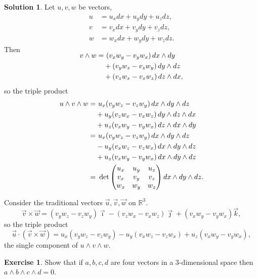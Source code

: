 \documentclass[11pt, a4paper]{report}
\theoremstyle{definition}
\newtheorem{exercise}{Exercise}[part]
\newtheorem{solution}{Solution}[part]
\newenvironment{ex}{\begin{exercise}}{\end{exercise}\pagebreak[1]}
\newenvironment{sol}{\begin{solution}}{\end{solution}\pagebreak[3]}
\newcommand*{\op}[1]{\ensuremath\mathop{}\mathopen{}#1}
\renewcommand*{\d}{\op{d}}
\begin{document}
\begin{sol}

Let $u, v, w$ be vectors,
\begin{align*}
    u &= u_x dx + u_y dy + u_z dz, \\
    v &= v_x dx + v_y dy + v_z dz, \\
    w &= w_x dx + w_y dy + w_z dz.
\end{align*}
Then
\begin{align*}
    \SwapAboveDisplaySkip
    v \wedge w =&\ (v_x w_y - v_y w_x) \d x \wedge dy \\
                &+ (v_y w_z - v_z w_y) \d y \wedge dz \\
                &+ (v_z w_x - v_x w_z) \d z \wedge dx,
\end{align*}
so the triple product
\begin{align*}
    u \wedge v \wedge w =&\ u_x (v_y w_z - v_z w_y) \d x \wedge dy \wedge dz \\
        &+ u_y (v_z w_x - v_x w_z) \d y \wedge dz \wedge dx \\
        &+ u_z (v_x w_y - v_y w_x) \d z \wedge dx \wedge dy \\
        =&\ u_x (v_y w_z - v_z w_y) \d x \wedge dy \wedge dz \\
        &- u_y (v_x w_z - v_z w_x) \d x \wedge dy \wedge dz \\
        &+ u_z (v_x w_y - v_y w_x) \d x \wedge dy \wedge dz \\
        =&\ \det \begin{pmatrix}
                u_x & u_y & u_z \\
                v_x & v_y & v_z \\
                w_x & w_y & w_z
            \end{pmatrix} dx \wedge dy \wedge dz.
\end{align*}

Consider the traditional vectors $\vec{u}, \vec{v}, \vec{w}$ on $\mathbb{R}^3$.
\[
    \vec{v} \times \vec{w}
        = (v_y w_z - v_z w_y) \vec{\imath}
          - (v_z w_x - v_x w_z) \vec{\jmath}
          + (v_x w_y - v_y w_x) \vec{k},
\]
so the triple product
\[
    \vec{u} \cdot (\vec{v} \times \vec{w})
        = u_x (v_y w_z - v_z w_y)
          - u_y (v_x w_z - v_z w_x)
          + u_z (v_x w_y - v_y w_x),
\]
the single component of $u \wedge v \wedge w$.

\end{sol}

\begin{ex}

Show that if $a, b, c, d$ are four vectors in a 3-dimensional space then $a \wedge b \wedge c \wedge d = 0$.

\end{ex}
\end{document}
